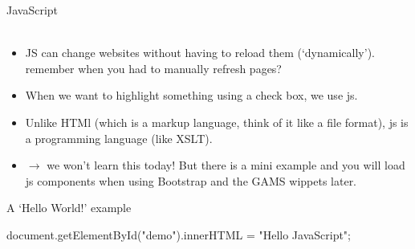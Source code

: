 \begin{frame}[fragile]{JavaScript}
\\
\\
\begin{itemize}\small 
    \item JS can change websites without having to reload them (`dynamically'). {\scriptsize remember when you had to manually refresh pages?}
    \item When we want to highlight something using a check box, we use js. 
    \item Unlike HTMl (which is a markup language, think of it like a file format), js is a programming language (like XSLT).
    \item \alert{$\to$ we won't learn this today!} {\footnotesize But there is a mini example and you will load js components when using Bootstrap and the GAMS wippets later.}
\end{itemize}


\begin{block}{A `Hello World!' example}
\begin{jscode}
document.getElementById("demo").innerHTML = "Hello JavaScript";
\end{jscode}
\end{block}

\end{frame}




